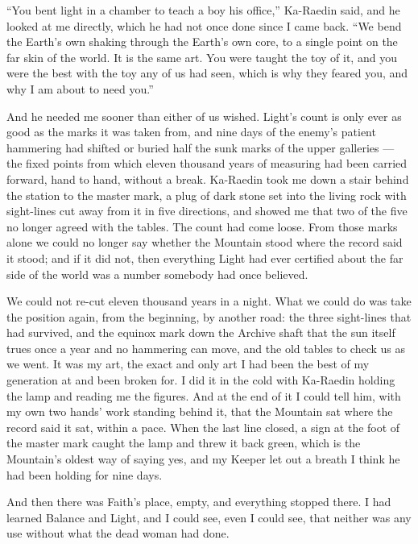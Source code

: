 ``You bent light in a chamber to teach a boy his office,'' Ka-Raedin said, and he looked at me directly, which he had not once done since I came back. ``We bend the Earth's own shaking through the Earth's own core, to a single point on the far skin of the world. It is the same art. You were taught the toy of it, and you were the best with the toy any of us had seen, which is why they feared you, and why I am about to need you.''\par

And he needed me sooner than either of us wished. Light's count is only ever as good as the marks it was taken from, and nine days of the enemy's patient hammering had shifted or buried half the sunk marks of the upper galleries --- the fixed points from which eleven thousand years of measuring had been carried forward, hand to hand, without a break. Ka-Raedin took me down a stair behind the station to the master mark, a plug of dark stone set into the living rock with sight-lines cut away from it in five directions, and showed me that two of the five no longer agreed with the tables. The count had come loose. From those marks alone we could no longer say whether the Mountain stood where the record said it stood; and if it did not, then everything Light had ever certified about the far side of the world was a number somebody had once believed.\par

We could not re-cut eleven thousand years in a night. What we could do was take the position again, from the beginning, by another road: the three sight-lines that had survived, and the equinox mark down the Archive shaft that the sun itself trues once a year and no hammering can move, and the old tables to check us as we went. It was my art, the exact and only art I had been the best of my generation at and been broken for. I did it in the cold with Ka-Raedin holding the lamp and reading me the figures. And at the end of it I could tell him, with my own two hands' work standing behind it, that the Mountain sat where the record said it sat, within a pace. When the last line closed, a sign at the foot of the master mark caught the lamp and threw it back green, which is the Mountain's oldest way of saying yes, and my Keeper let out a breath I think he had been holding for nine days.\par

\ornament

And then there was Faith's place, empty, and everything stopped there. I had learned Balance and Light, and I could see, even I could see, that neither was any use without what the dead woman had done.\par


